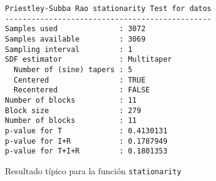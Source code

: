 \begin{figure}
\centering
\begin{lstlisting}[caption={}]
Priestley-Subba Rao stationarity Test for datos
-----------------------------------------------
Samples used              : 3072 
Samples available         : 3069 
Sampling interval         : 1 
SDF estimator             : Multitaper 
  Number of (sine) tapers : 5 
  Centered                : TRUE 
  Recentered              : FALSE 
Number of blocks          : 11 
Block size                : 279 
Number of blocks          : 11 
p-value for T             : 0.4130131 
p-value for I+R           : 0.1787949 
p-value for T+I+R         : 0.1801353 
\end{lstlisting}
\caption{Resultado típico para la función \texttt{stationarity}
}
\label{res_psr}
\end{figure}

